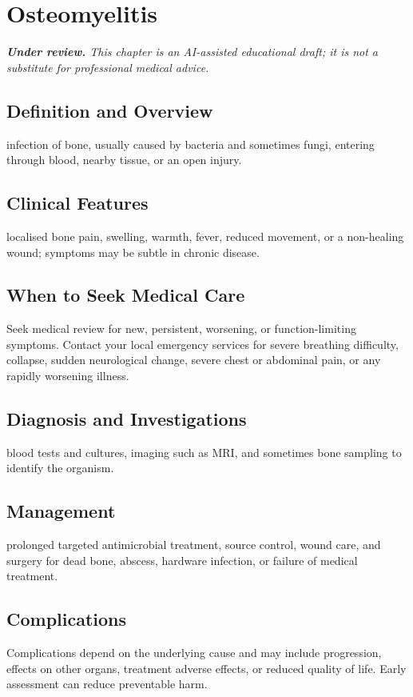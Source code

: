 \chapter{Osteomyelitis}

\medskip
\noindent\textit{\textbf{Under review.} This chapter is an AI-assisted educational draft; it is not a substitute for professional medical advice.}

\section*{Definition and Overview}
infection of bone, usually caused by bacteria and sometimes fungi, entering through blood, nearby tissue, or an open injury.

\section*{Clinical Features}
localised bone pain, swelling, warmth, fever, reduced movement, or a non-healing wound; symptoms may be subtle in chronic disease.

\section*{When to Seek Medical Care}
Seek medical review for new, persistent, worsening, or function-limiting symptoms. Contact your local emergency services for severe breathing difficulty, collapse, sudden neurological change, severe chest or abdominal pain, or any rapidly worsening illness.

\section*{Diagnosis and Investigations}
blood tests and cultures, imaging such as MRI, and sometimes bone sampling to identify the organism.

\section*{Management}
prolonged targeted antimicrobial treatment, source control, wound care, and surgery for dead bone, abscess, hardware infection, or failure of medical treatment.

\section*{Complications}
Complications depend on the underlying cause and may include progression, effects on other organs, treatment adverse effects, or reduced quality of life. Early assessment can reduce preventable harm.

